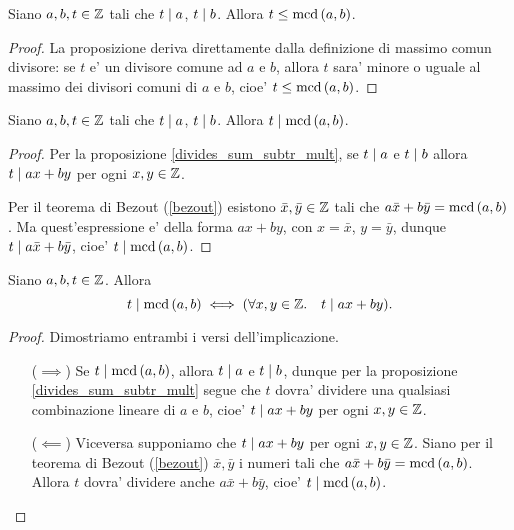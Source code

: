 \begin{proposition} \label{greatest_common_divisor}
    Siano $a, b, t \in \mathbb{Z}$ tali che $t \mid a$, $t \mid b$. Allora $t \leq \operatorname{mcd}\left(a, b\right)$.
\end{proposition}
\begin{proof}
    La proposizione deriva direttamente dalla definizione di massimo comun divisore: se $t$ e' un divisore comune ad $a$ e $b$, allora $t$ sara' minore o uguale al massimo dei divisori comuni di $a$ e $b$, cioe' $t \leq \operatorname{mcd}\left(a, b\right)$.
\end{proof}

\begin{proposition} \label{divisori_dividono_mcd}
    Siano $a, b, t \in \mathbb{Z}$ tali che $t \mid a$, $t \mid b$.  Allora $t \mid \operatorname{mcd}\left(a, b\right)$.
\end{proposition}
\begin{proof}
    Per la proposizione \ref{divides_sum_subtr_mult}, se $t \mid a$ e $t \mid b$ allora $t \mid ax+by$ per ogni $x, y \in \mathbb{Z}$.

    Per il teorema di Bezout (\ref{bezout}) esistono $\bar{x}, \bar{y} \in \mathbb{Z}$ tali che $a\bar{x}+b\bar{y} = \operatorname{mcd}\left(a, b\right)$. Ma quest'espressione e' della forma $ax + by$, con $x = \bar{x}$, $y = \bar{y}$, dunque 
    $t \mid a\bar{x} + b\bar{y}$, cioe' $t \mid \operatorname{mcd}\left(a, b\right)$.
\end{proof}

\begin{proposition} \label{t_divides_gcd_lincomb}
    Siano $a, b, t \in \mathbb{Z}$. Allora 
    \begin{equation}
        t \mid \operatorname{mcd}\left(a, b\right) \iff (\forall x, y \in \mathbb{Z}. \quad t \mid ax + by).
    \end{equation}
\end{proposition}
\begin{proof}
    Dimostriamo entrambi i versi dell'implicazione.
    \begin{itemize}
        \item[($\implies$)] Se $t \mid \operatorname{mcd}\left(a, b\right)$, allora $t \mid a$ e $t \mid b$, dunque per la proposizione \ref{divides_sum_subtr_mult} segue che $t$ dovra' dividere una qualsiasi combinazione lineare di $a$ e $b$, cioe' $t \mid ax+by$ per ogni $x, y \in \mathbb{Z}$.
        \item[($\impliedby$)] Viceversa supponiamo che $t \mid ax+by$ per ogni $x, y \in \mathbb{Z}$. Siano per il teorema di Bezout (\ref{bezout}) $\bar{x}, \bar{y}$ i numeri tali che $a\bar{x} + b\bar{y} = \operatorname{mcd}\left(a, b\right)$. Allora $t$ dovra' dividere anche $a\bar{x} + b\bar{y}$, cioe' $t \mid \operatorname{mcd}\left(a, b\right)$. \qedhere
    \end{itemize}
\end{proof}

